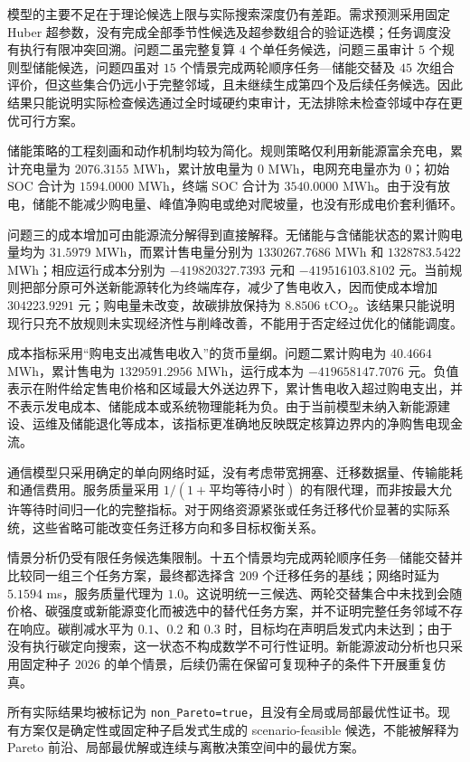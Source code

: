 模型的主要不足在于理论候选上限与实际搜索深度仍有差距。需求预测采用固定 Huber 超参数，没有完成全部季节性候选及超参数组合的验证选模；任务调度没有执行有限冲突回溯。问题二虽完整复算 $4$ 个单任务候选，问题三虽审计 $5$ 个规则型储能候选，问题四虽对 $15$ 个情景完成两轮顺序任务—储能交替及 $45$ 次组合评价，但这些集合仍远小于完整邻域，且未继续生成第四个及后续任务候选。因此结果只能说明实际检查候选通过全时域硬约束审计，无法排除未检查邻域中存在更优可行方案。

储能策略的工程刻画和动作机制均较为简化。规则策略仅利用新能源富余充电，累计充电量为 $2076.3155$ MWh，累计放电量为 $0$ MWh，电网充电量亦为 $0$；初始 SOC 合计为 $1594.0000$ MWh，终端 SOC 合计为 $3540.0000$ MWh。由于没有放电，储能不能减少购电量、峰值净购电或绝对爬坡量，也没有形成电价套利循环。

问题三的成本增加可由能源流分解得到直接解释。无储能与含储能状态的累计购电量均为 $31.5979$ MWh，而累计售电量分别为 $1330267.7686$ MWh 和 $1328783.5422$ MWh；相应运行成本分别为 $-419820327.7393$ 元和 $-419516103.8102$ 元。当前规则把部分原可外送新能源转化为终端库存，减少了售电收入，因而使成本增加 $304223.9291$ 元；购电量未改变，故碳排放保持为 $8.8506$ tCO$_2$。该结果只能说明现行只充不放规则未实现经济性与削峰改善，不能用于否定经过优化的储能调度。

成本指标采用“购电支出减售电收入”的货币量纲。问题二累计购电为 $40.4664$ MWh，累计售电为 $1329591.2956$ MWh，运行成本为 $-419658147.7076$ 元。负值表示在附件给定售电价格和区域最大外送边界下，累计售电收入超过购电支出，并不表示发电成本、储能成本或系统物理能耗为负。由于当前模型未纳入新能源建设、运维及储能退化等成本，该指标更准确地反映既定核算边界内的净购售电现金流。

通信模型只采用确定的单向网络时延，没有考虑带宽拥塞、迁移数据量、传输能耗和通信费用。服务质量采用 $1/(1+\text{平均等待小时})$ 的有限代理，而非按最大允许等待时间归一化的完整指标。对于网络资源紧张或任务迁移代价显著的实际系统，这些省略可能改变任务迁移方向和多目标权衡关系。

情景分析仍受有限任务候选集限制。十五个情景均完成两轮顺序任务—储能交替并比较同一组三个任务方案，最终都选择含 $209$ 个迁移任务的基线；网络时延为 $5.1594$ ms，服务质量代理为 $1.0$。这说明统一三候选、两轮交替集合中未找到会随价格、碳强度或新能源变化而被选中的替代任务方案，并不证明完整任务邻域不存在响应。碳削减水平为 $0.1$、$0.2$ 和 $0.3$ 时，目标均在声明启发式内未达到；由于没有执行碳定向搜索，这一状态不构成数学不可行性证明。新能源波动分析也只采用固定种子 $2026$ 的单个情景，后续仍需在保留可复现种子的条件下开展重复仿真。

所有实际结果均被标记为 \texttt{non\_Pareto=true}，且没有全局或局部最优性证书。现有方案仅是确定性或固定种子启发式生成的 scenario-feasible 候选，不能被解释为 Pareto 前沿、局部最优解或连续与离散决策空间中的最优方案。

